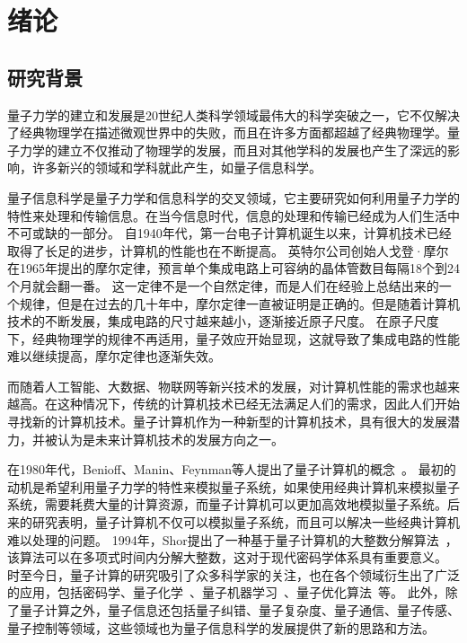 \chapter{绪论}

\section{研究背景}

量子力学的建立和发展是20世纪人类科学领域最伟大的科学突破之一，它不仅解决了经典物理学在描述微观世界中的失败，而且在许多方面都超越了经典物理学。量子力学的建立不仅推动了物理学的发展，而且对其他学科的发展也产生了深远的影响，许多新兴的领域和学科就此产生，如量子信息科学。

量子信息科学是量子力学和信息科学的交叉领域，它主要研究如何利用量子力学的特性来处理和传输信息。在当今信息时代，信息的处理和传输已经成为人们生活中不可或缺的一部分。
自1940年代，第一台电子计算机诞生以来，计算机技术已经取得了长足的进步，计算机的性能也在不断提高。
英特尔公司创始人戈登·摩尔在1965年提出的摩尔定律，预言单个集成电路上可容纳的晶体管数目每隔18个到24个月就会翻一番。
这一定律不是一个自然定律，而是人们在经验上总结出来的一个规律，但是在过去的几十年中，摩尔定律一直被证明是正确的。但是随着计算机技术的不断发展，集成电路的尺寸越来越小，逐渐接近原子尺度。
在原子尺度下，经典物理学的规律不再适用，量子效应开始显现，这就导致了集成电路的性能难以继续提高，摩尔定律也逐渐失效。

而随着人工智能、大数据、物联网等新兴技术的发展，对计算机性能的需求也越来越高。在这种情况下，传统的计算机技术已经无法满足人们的需求，因此人们开始寻找新的计算机技术。量子计算机作为一种新型的计算机技术，具有很大的发展潜力，并被认为是未来计算机技术的发展方向之一。

在1980年代，Benioff、Manin、Feynman等人提出了量子计算机的概念~\cite{Benioff1980,Benioff1982a,Benioff1982b,Manin1980,Feynman1982}。
最初的动机是希望利用量子力学的特性来模拟量子系统，如果使用经典计算机来模拟量子系统，需要耗费大量的计算资源，而量子计算机可以更加高效地模拟量子系统。后来的研究表明，量子计算机不仅可以模拟量子系统，而且可以解决一些经典计算机难以处理的问题。
1994年，Shor提出了一种基于量子计算机的大整数分解算法~\cite{shor1994algorithms}，该算法可以在多项式时间内分解大整数，这对于现代密码学体系具有重要意义。
时至今日，量子计算的研究吸引了众多科学家的关注，也在各个领域衍生出了广泛的应用，包括密码学、量子化学~\cite{peruzzo2014variational, Kandala2017hardware,li2022toward}、量子机器学习~\cite{beer2020training,huang2021experimental,havlivcek2019supervised,mitarai2018quantum}、量子优化算法~\cite{farhi2014quantum,moll2018quantum}等。
此外，除了量子计算之外，量子信息还包括量子纠错、量子复杂度、量子通信、量子传感、量子控制等领域，这些领域也为量子信息科学的发展提供了新的思路和方法。

